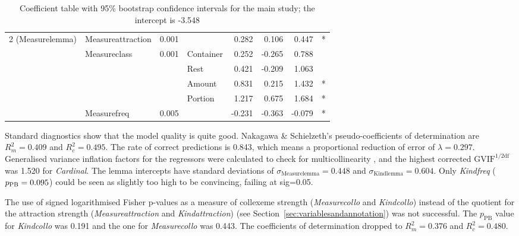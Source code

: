 \begin{table}
{\begin{tabular}{llrlrrrc}
    2 (Measurelemma) & Measureattraction &  0.001                 &              &  0.282      &  0.106 &  0.447  & *             \\
                    & Measureclass      &  0.001                 & Container    &  0.252      & -0.265 &  0.788  &               \\
                    &                   &                        & Rest         &  0.421      & -0.209 &  1.063  &               \\
                    &                   &                        & Amount       &  0.831      &  0.215 &  1.432  & *             \\
                    &                   &                        & Portion      &  1.217      &  0.675 &  1.684  & *             \\
                    & Measurefreq       &  0.005                 &              & -0.231      & -0.363 & -0.079  & *             \\

  \end{tabular}
  }
  \caption{Coefficient table with 95\% bootstrap confidence intervals for the main study; the intercept is -3.548}
  \label{tab:bigtable}
\end{table}

Standard diagnostics show that the model quality is quite good.
Nakagawa \& Schielzeth's pseudo-coefficients of determination are $R_m^2=0.409$ and $R^2_c=0.495$.
The rate of correct predictions is 0.843, which means a proportional reduction of error of $\lambda=0.297$.
Generalised variance inflation factors for the regressors were calculated to check for multicollinearity \citep{FoxMonette1992,ZuurEa2010}, and the highest corrected $\text{GVIF}^{1/2\text{df}}$ was 1.520 for \textit{Cardinal}.
The lemma intercepts have standard deviations of $\sigma_{\text{Measurelemma}}=0.448$ and $\sigma_{\text{Kindlemma}}=0.604$.
Only \textit{Kindfreq} ($p_{\text{PB}}=0.095$) could be seen as slightly too high to be convincing, failing at sig=0.05.

The use of signed logarithmised Fisher p-values as a measure of collexeme strength (\textit{Measurecollo} and \textit{Kindcollo}) instead of the quotient for the attraction strength (\textit{Measureattraction} and \textit{Kindattraction}) (see Section~\ref{sec:variablesandannotation}) was not successful.
The $p_{\text{PB}}$ value for \textit{Kindcollo} was 0.191 and the one for \textit{Measurecollo} was 0.443.
The coefficients of determination dropped to $R_m^2=0.376$ and $R^2_c=0.480$.

